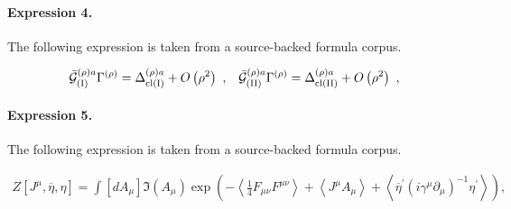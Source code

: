 \documentclass[11pt]{article}
\begin{document}
\paragraph{Expression 4.} The following expression is taken from a source-backed formula corpus.

\begin{align*}{\bar{{\cal G}}}_{({\rm I})}^{\left( \rho \right) a}\Gamma ^{\left( \rho\right) }=\Delta _{{\rm cl}({\rm I})}^{\left( \rho \right) a}+O\left( \rho^2\right) \,\,,\;\;\;{\bar{{\cal G}}}_{({\rm II})}^{\left( \rho \right)a}\Gamma ^{\left( \rho \right) }=\Delta _{{\rm cl}({\rm II})}^{\left( \rho\right) a}+O\left( \rho ^2\right) \,\,, \end{align*}

\paragraph{Expression 5.} The following expression is taken from a source-backed formula corpus.

\begin{align*}Z\left[ J^\mu ,\overline{\eta },\eta \right] =\int\left[ dA_\mu \right] \Im \left( A_\mu \right) \exp \left( -\left\langle\frac 14F_{\mu \nu }F^{\mu \nu }\right\rangle +\left\langle J^\mu A_\mu\right\rangle +\left\langle \overline{\eta }^{\prime }\left( i\gamma ^\mu\partial _\mu \right) ^{-1}\eta ^{\prime }\right\rangle \right) ,\end{align*}
\end{document}
